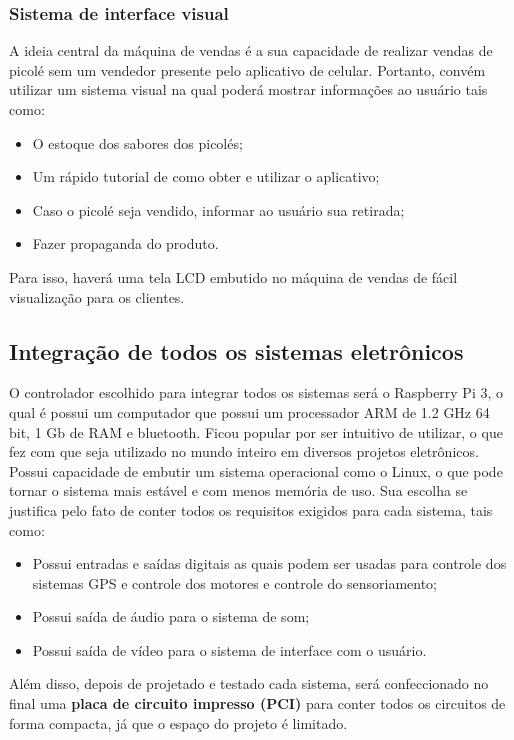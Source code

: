 \subsubsection{Sistema de interface visual}

A ideia central da máquina de vendas é a sua capacidade de realizar vendas de picolé sem um vendedor presente pelo aplicativo de celular. Portanto, convém utilizar um sistema visual na qual poderá mostrar informações ao usuário tais como:

\begin{itemize}
  \item O estoque dos sabores dos picolés;
  \item Um rápido tutorial de como obter e utilizar o aplicativo;
  \item Caso o picolé seja vendido, informar ao usuário sua retirada;
  \item Fazer propaganda do produto.
\end{itemize}

Para isso, haverá uma tela LCD embutido no máquina de vendas de fácil visualização para os clientes.

\subsection{Integração de todos os sistemas eletrônicos}

O controlador escolhido para integrar todos os sistemas será o Raspberry Pi 3, o qual é possui um computador que possui um processador ARM de 1.2 GHz 64 bit, 1 Gb de RAM e bluetooth. Ficou popular por ser intuitivo de utilizar, o que fez com que seja utilizado no mundo inteiro em diversos projetos eletrônicos. Possui capacidade de embutir um sistema operacional como o Linux, o que pode tornar o sistema mais estável e com menos memória de uso. Sua escolha se justifica pelo fato de conter todos os requisitos exigidos para cada sistema, tais como:

\begin{itemize}
  \item Possui entradas e saídas digitais as quais podem ser usadas para controle dos sistemas GPS e controle dos motores e controle do sensoriamento;
  \item Possui saída de áudio para o sistema de som;
  \item Possui saída de vídeo para o sistema de interface com o usuário.
\end{itemize}

Além disso, depois de projetado e testado cada sistema, será confeccionado no final uma \textbf{placa de circuito impresso (PCI)} para conter todos os circuitos de forma compacta, já que o espaço do projeto é limitado.

